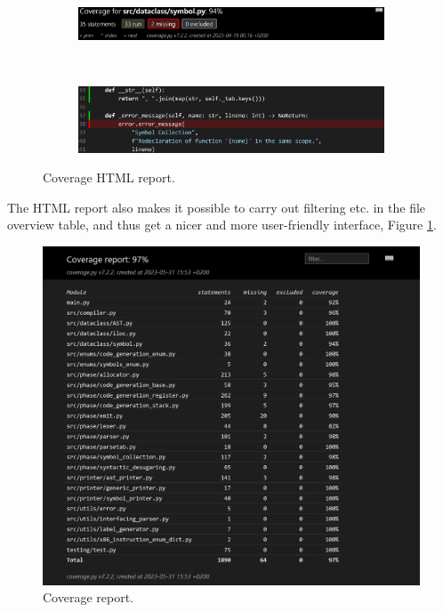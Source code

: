 \begin{figure}[H]
    \centering
    \begin{subfigure}{1\textwidth}
        \centering
        \includegraphics[width=1\textwidth]{misc/images/Coverage_Panel.png}
        \end{subfigure}\\
        \begin{subfigure}{1\textwidth}
        \centering
        \includegraphics[width=1\textwidth]{misc/images/Coverage_Info.png}
        \end{subfigure}
    \caption{Coverage HTML report.}
\end{figure}

The HTML report also makes it possible to carry out filtering etc. in the file overview table, and thus get a nicer and more user-friendly interface, Figure \ref{fig:cov_report}.

\begin{figure}[H]
    \centering
    \includegraphics[width=1\textwidth]{misc/images/Coverage_report.png}
    \caption{Coverage report.}
    \label{fig:cov_report}
\end{figure}

